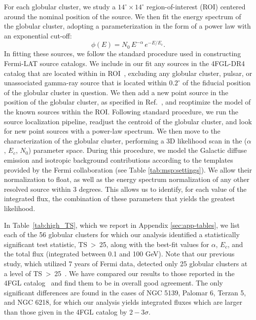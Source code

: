 For each globular cluster, we study a $14^{\circ} \times 14^{\circ}$ region-of-interest (ROI) centered around the nominal position of the source. We then fit the energy spectrum of the globular cluster, adopting a parameterization in the form of a power law with an exponential cut-off:
\begin{equation}
    \phi(E) = N_0 \, E^{-\alpha} \, e^{-E/E_c}. 
\label{eq:energy-spectrum}
\end{equation}
%
In fitting these sources, we follow the standard procedure used in constructing Fermi-LAT source catalogs. 
We include in our fit any sources in the 4FGL-DR4 catalog that are located within in ROI~\cite{ballet2024fermilargeareatelescope}, excluding any globular cluster, pulsar, or unassociated gamma-ray source that is located within $0.2^\circ$ of the fiducial position of the globular cluster in question. We then add a new point source in the position of the globular cluster, as specified in Ref.~\cite{harris2010newcatalogglobularclusters}, and reoptimize the model of the known sources within the ROI.
Following standard procedure, we run the source localization pipeline, readjust the centroid of the globular cluster, and look for new point sources with a power-law spectrum. 
We then move to the characterization of the globular cluster, performing a 3D likelihood scan in the ($\alpha$, $E_{c}$, $N_0$) parameter space. 
%
During this procedure, we model the Galactic diffuse emission and isotropic background contributions according to the templates provided by the Fermi collaboration (see Table \ref{tab:msp:settings}). We allow their normalization to float, as well as the energy spectrum normalization of any other resolved source within 3 degrees.
%
This allows us to identify, for each value of the integrated flux, the combination of these parameters that yields the greatest likelihood. 

In Table~\ref{tab:high_TS}, which we report in Appendix \ref{sec:app-tables}, we list each of the 56 globular clusters for which our analysis identified a statistically significant test statistic, \mbox{TS > 25}, along with the best-fit values for $\alpha$, $E_c$, and the total flux (integrated between 0.1 and 100 GeV). Note that our previous study, which utilized 7 years of Fermi data, detected only 25 globular clusters at a level of \mbox{TS > 25}~\cite{Hooper:2016rap}. We have compared our results to those reported in the 4FGL catalog~\cite{ballet2024fermilargeareatelescope} and find them to be in overall good agreement. The only significant differences are found in the cases of NGC 5139, Palomar 6, Terzan 5, and NGC 6218, for which our analysis yields integrated fluxes which are larger than those given in the 4FGL catalog by $2-3\sigma$. 

